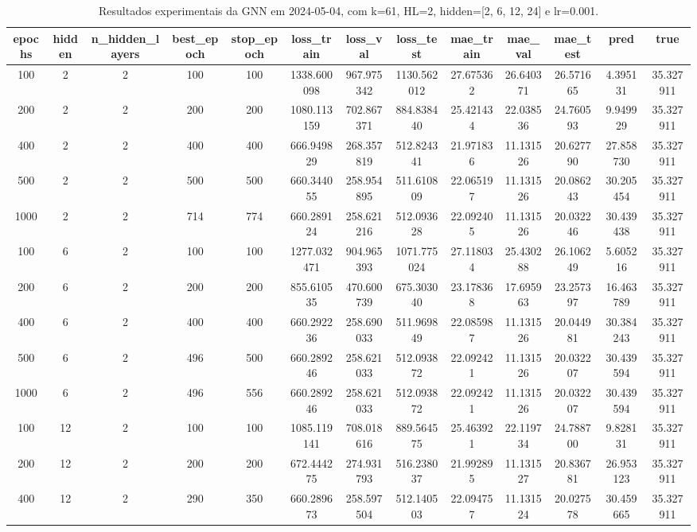 \begin{table}[h]
\centering
\caption{Resultados experimentais da GNN em 2024-05-04, com k=61, HL=2, hidden=[2, 6, 12, 24] e lr=0.001.}
\label{tab:gnn_results_k61_hl2_d20240504}
\begin{tabular}{ccccccccccccc}
\toprule
epochs & hidden & n\_hidden\_layers & best\_epoch & stop\_epoch & loss\_train & loss\_val & loss\_test & mae\_train & mae\_val & mae\_test & pred & true \\
\midrule
100 & 2 & 2 & 100 & 100 & 1338.600098 & 967.975342 & 1130.562012 & 27.675362 & 26.640371 & 26.571665 & 4.395131 & 35.327911 \\
200 & 2 & 2 & 200 & 200 & 1080.113159 & 702.867371 & 884.838440 & 25.421434 & 22.038536 & 24.760593 & 9.949929 & 35.327911 \\
400 & 2 & 2 & 400 & 400 & 666.949829 & 268.357819 & 512.824341 & 21.971836 & 11.131526 & 20.627790 & 27.858730 & 35.327911 \\
500 & 2 & 2 & 500 & 500 & 660.344055 & 258.954895 & 511.610809 & 22.065197 & 11.131526 & 20.086243 & 30.205454 & 35.327911 \\
1000 & 2 & 2 & 714 & 774 & 660.289124 & 258.621216 & 512.093628 & 22.092405 & 11.131526 & 20.032246 & 30.439438 & 35.327911 \\
100 & 6 & 2 & 100 & 100 & 1277.032471 & 904.965393 & 1071.775024 & 27.118034 & 25.430288 & 26.106249 & 5.605216 & 35.327911 \\
200 & 6 & 2 & 200 & 200 & 855.610535 & 470.600739 & 675.303040 & 23.178368 & 17.695963 & 23.257397 & 16.463789 & 35.327911 \\
400 & 6 & 2 & 400 & 400 & 660.292236 & 258.690033 & 511.969849 & 22.085987 & 11.131526 & 20.044981 & 30.384243 & 35.327911 \\
500 & 6 & 2 & 496 & 500 & 660.289246 & 258.621033 & 512.093872 & 22.092421 & 11.131526 & 20.032207 & 30.439594 & 35.327911 \\
1000 & 6 & 2 & 496 & 556 & 660.289246 & 258.621033 & 512.093872 & 22.092421 & 11.131526 & 20.032207 & 30.439594 & 35.327911 \\
100 & 12 & 2 & 100 & 100 & 1085.119141 & 708.018616 & 889.564575 & 25.463921 & 22.119734 & 24.788700 & 9.828131 & 35.327911 \\
200 & 12 & 2 & 200 & 200 & 672.444275 & 274.931793 & 516.238037 & 21.992895 & 11.131527 & 20.836781 & 26.953123 & 35.327911 \\
400 & 12 & 2 & 290 & 350 & 660.289673 & 258.597504 & 512.140503 & 22.094757 & 11.131524 & 20.027578 & 30.459665 & 35.327911 \\

\end{tabular}
\end{table}
